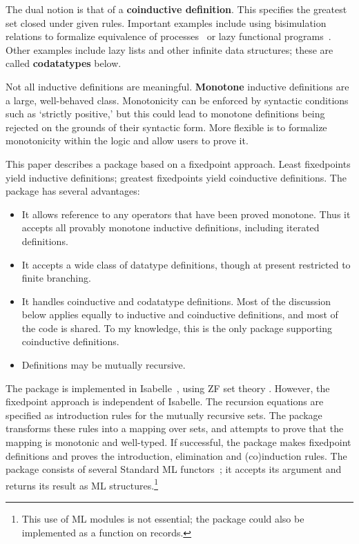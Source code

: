 The dual notion is that of a {\bf coinductive definition}.  This specifies
the greatest set closed under given rules.  Important examples include
using bisimulation relations to formalize equivalence of
processes~\cite{milner89} or lazy functional programs~\cite{abramsky90}.
Other examples include lazy lists and other infinite data structures; these
are called {\bf codatatypes} below.

Not all inductive definitions are meaningful.  {\bf Monotone} inductive
definitions are a large, well-behaved class.  Monotonicity can be enforced
by syntactic conditions such as `strictly positive,' but this could lead to
monotone definitions being rejected on the grounds of their syntactic form.
More flexible is to formalize monotonicity within the logic and allow users
to prove it.

This paper describes a package based on a fixedpoint approach.  Least
fixedpoints yield inductive definitions; greatest fixedpoints yield
coinductive definitions.  The package has several advantages:
\begin{itemize}
\item It allows reference to any operators that have been proved monotone.
  Thus it accepts all provably monotone inductive definitions, including
  iterated definitions.
\item It accepts a wide class of datatype definitions, though at present
  restricted to finite branching.
\item It handles coinductive and codatatype definitions.  Most of
  the discussion below applies equally to inductive and coinductive
  definitions, and most of the code is shared.  To my knowledge, this is
  the only package supporting coinductive definitions.
\item Definitions may be mutually recursive.
\end{itemize}
The package is implemented in Isabelle~\cite{isabelle-intro}, using ZF set
theory \cite{paulson-set-I,paulson-set-II}.  However, the fixedpoint
approach is independent of Isabelle.  The recursion equations are specified
as introduction rules for the mutually recursive sets.  The package
transforms these rules into a mapping over sets, and attempts to prove that
the mapping is monotonic and well-typed.  If successful, the package
makes fixedpoint definitions and proves the introduction, elimination and
(co)induction rules.  The package consists of several Standard ML
functors~\cite{paulson91}; it accepts its argument and returns its result
as ML structures.\footnote{This use of ML modules is not essential; the
  package could also be implemented as a function on records.}

